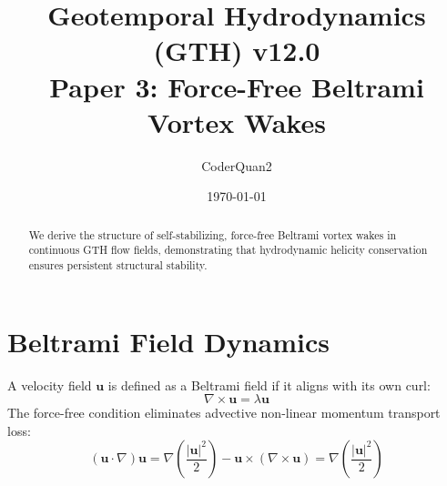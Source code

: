 \documentclass[11pt,a4paper]{article}
\title{\textbf{Geotemporal Hydrodynamics (GTH) v12.0\\Paper 3: Force-Free Beltrami Vortex Wakes}}
\author{CoderQuan2}
\date{\today}
\begin{document}
\maketitle
\begin{abstract}
We derive the structure of self-stabilizing, force-free Beltrami vortex wakes in continuous GTH flow fields, demonstrating that hydrodynamic helicity conservation ensures persistent structural stability.
\end{abstract}
\section{Beltrami Field Dynamics}
A velocity field $\mathbf{u}$ is defined as a Beltrami field if it aligns with its own curl:
\begin{equation}
\nabla \times \mathbf{u} = \lambda \mathbf{u}
\end{equation}
The force-free condition eliminates advective non-linear momentum transport loss:
\begin{equation}
(\mathbf{u} \cdot \nabla) \mathbf{u} = \nabla \left(\frac{|\mathbf{u}|^2}{2}\right) - \mathbf{u} \times (\nabla \times \mathbf{u}) = \nabla \left(\frac{|\mathbf{u}|^2}{2}\right)
\end{equation}
\end{document}
